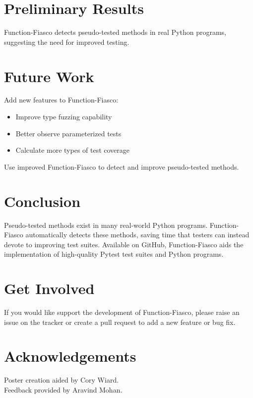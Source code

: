 \documentclass[a0paper,fleqn]{betterposter}
\begin{document}
{  }{


  \section{Preliminary Results}

  \vspace*{-1in}

  

  \vspace*{-.5in}

  Function-Fiasco detects pseudo-tested methods in real Python programs,
  suggesting the need for improved testing.

  \section{Future Work}
  Add new features to Function-Fiasco: \\
  \vspace*{-.5in}

  \begin{itemize}[leftmargin=*]

    \item{Improve type fuzzing capability}
    \item{Better observe parameterized tests}
    \item{Calculate more types of test coverage}

  \end{itemize}

  \vspace{.5em}
  Use improved Function-Fiasco to detect and improve pseudo-tested methods.

  \section{Conclusion}
  Pseudo-tested methods exist in many real-world Python programs.
  Function-Fiasco automatically detects these methods, saving time that testers
  can instead devote to improving test suites.
  Available on GitHub, Function-Fiasco aids the implementation of high-quality
  Pytest test suites and Python programs.

  \section{Get Involved}
  If you would like support the development of Function-Fiasco, please raise an
  issue on the tracker or create a pull request to add a new feature or bug
  fix.
  \vfill

  \section{Acknowledgements}
  Poster creation aided by Cory Wiard.\\
  Feedback provided by Aravind Mohan.\\


}
\end{document}
